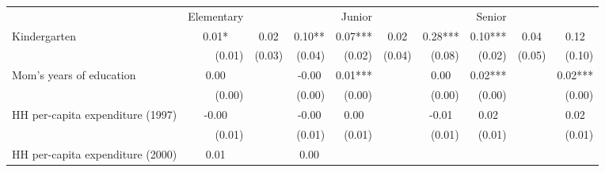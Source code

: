 \begin{tabular}{llllllllll}
\cline{1-10}
\multicolumn{1}{c}{} &
  \multicolumn{1}{|r}{Elementary} &
  \multicolumn{1}{r}{} &
  \multicolumn{1}{r}{} &
  \multicolumn{1}{r}{Junior} &
  \multicolumn{1}{r}{} &
  \multicolumn{1}{r}{} &
  \multicolumn{1}{r}{Senior} &
  \multicolumn{1}{r}{} &
  \multicolumn{1}{r}{} \\
\cline{1-10}
\multicolumn{1}{l}{Kindergarten} &
  \multicolumn{1}{|c}{0.01* } &
  \multicolumn{1}{c}{0.02 } &
  \multicolumn{1}{c}{0.10** } &
  \multicolumn{1}{c}{0.07***} &
  \multicolumn{1}{c}{0.02 } &
  \multicolumn{1}{c}{0.28***} &
  \multicolumn{1}{c}{0.10***} &
  \multicolumn{1}{c}{0.04 } &
  \multicolumn{1}{c}{0.12 } \\
\multicolumn{1}{l}{} &
  \multicolumn{1}{|r}{(0.01)} &
  \multicolumn{1}{r}{(0.03)} &
  \multicolumn{1}{r}{(0.04)} &
  \multicolumn{1}{r}{(0.02)} &
  \multicolumn{1}{r}{(0.04)} &
  \multicolumn{1}{r}{(0.08)} &
  \multicolumn{1}{r}{(0.02)} &
  \multicolumn{1}{r}{(0.05)} &
  \multicolumn{1}{r}{(0.10)} \\
\multicolumn{1}{l}{Mom's years of education} &
  \multicolumn{1}{|c}{0.00 } &
  \multicolumn{1}{c}{} &
  \multicolumn{1}{c}{-0.00 } &
  \multicolumn{1}{c}{0.01***} &
  \multicolumn{1}{c}{} &
  \multicolumn{1}{c}{0.00 } &
  \multicolumn{1}{c}{0.02***} &
  \multicolumn{1}{c}{} &
  \multicolumn{1}{c}{0.02***} \\
\multicolumn{1}{l}{} &
  \multicolumn{1}{|r}{(0.00)} &
  \multicolumn{1}{r}{} &
  \multicolumn{1}{r}{(0.00)} &
  \multicolumn{1}{r}{(0.00)} &
  \multicolumn{1}{r}{} &
  \multicolumn{1}{r}{(0.00)} &
  \multicolumn{1}{r}{(0.00)} &
  \multicolumn{1}{r}{} &
  \multicolumn{1}{r}{(0.00)} \\
\multicolumn{1}{l}{HH per-capita expenditure (1997)} &
  \multicolumn{1}{|c}{-0.00 } &
  \multicolumn{1}{c}{} &
  \multicolumn{1}{c}{-0.00 } &
  \multicolumn{1}{c}{0.00 } &
  \multicolumn{1}{c}{} &
  \multicolumn{1}{c}{-0.01 } &
  \multicolumn{1}{c}{0.02 } &
  \multicolumn{1}{c}{} &
  \multicolumn{1}{c}{0.02 } \\
\multicolumn{1}{l}{} &
  \multicolumn{1}{|r}{(0.01)} &
  \multicolumn{1}{r}{} &
  \multicolumn{1}{r}{(0.01)} &
  \multicolumn{1}{r}{(0.01)} &
  \multicolumn{1}{r}{} &
  \multicolumn{1}{r}{(0.01)} &
  \multicolumn{1}{r}{(0.01)} &
  \multicolumn{1}{r}{} &
  \multicolumn{1}{r}{(0.01)} \\
\multicolumn{1}{l}{HH per-capita expenditure (2000)} &
  \multicolumn{1}{|c}{0.01 } &
  \multicolumn{1}{c}{} &
  \multicolumn{1}{c}{0.00 } &

\end{tabular}
